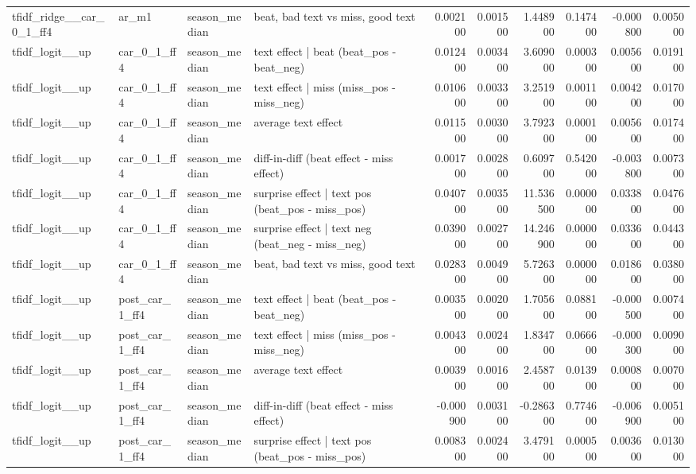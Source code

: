 \begin{table}
\begin{tabular}{llllrrrrrr}
tfidf\_ridge\_\_car\_0\_1\_ff4 & ar\_m1 & season\_median & beat, bad text vs miss, good text & 0.002100 & 0.001500 & 1.448900 & 0.147400 & -0.000800 & 0.005000 \\
tfidf\_logit\_\_up & car\_0\_1\_ff4 & season\_median & text effect | beat  (beat\_pos - beat\_neg) & 0.012400 & 0.003400 & 3.609000 & 0.000300 & 0.005600 & 0.019100 \\
tfidf\_logit\_\_up & car\_0\_1\_ff4 & season\_median & text effect | miss  (miss\_pos - miss\_neg) & 0.010600 & 0.003300 & 3.251900 & 0.001100 & 0.004200 & 0.017000 \\
tfidf\_logit\_\_up & car\_0\_1\_ff4 & season\_median & average text effect & 0.011500 & 0.003000 & 3.792300 & 0.000100 & 0.005600 & 0.017400 \\
tfidf\_logit\_\_up & car\_0\_1\_ff4 & season\_median & diff-in-diff (beat effect - miss effect) & 0.001700 & 0.002800 & 0.609700 & 0.542000 & -0.003800 & 0.007300 \\
tfidf\_logit\_\_up & car\_0\_1\_ff4 & season\_median & surprise effect | text pos (beat\_pos - miss\_pos) & 0.040700 & 0.003500 & 11.536500 & 0.000000 & 0.033800 & 0.047600 \\
tfidf\_logit\_\_up & car\_0\_1\_ff4 & season\_median & surprise effect | text neg (beat\_neg - miss\_neg) & 0.039000 & 0.002700 & 14.246900 & 0.000000 & 0.033600 & 0.044300 \\
tfidf\_logit\_\_up & car\_0\_1\_ff4 & season\_median & beat, bad text vs miss, good text & 0.028300 & 0.004900 & 5.726300 & 0.000000 & 0.018600 & 0.038000 \\
tfidf\_logit\_\_up & post\_car\_1\_ff4 & season\_median & text effect | beat  (beat\_pos - beat\_neg) & 0.003500 & 0.002000 & 1.705600 & 0.088100 & -0.000500 & 0.007400 \\
tfidf\_logit\_\_up & post\_car\_1\_ff4 & season\_median & text effect | miss  (miss\_pos - miss\_neg) & 0.004300 & 0.002400 & 1.834700 & 0.066600 & -0.000300 & 0.009000 \\
tfidf\_logit\_\_up & post\_car\_1\_ff4 & season\_median & average text effect & 0.003900 & 0.001600 & 2.458700 & 0.013900 & 0.000800 & 0.007000 \\
tfidf\_logit\_\_up & post\_car\_1\_ff4 & season\_median & diff-in-diff (beat effect - miss effect) & -0.000900 & 0.003100 & -0.286300 & 0.774600 & -0.006900 & 0.005100 \\
tfidf\_logit\_\_up & post\_car\_1\_ff4 & season\_median & surprise effect | text pos (beat\_pos - miss\_pos) & 0.008300 & 0.002400 & 3.479100 & 0.000500 & 0.003600 & 0.013000 \\

\end{tabular}
\end{table}
